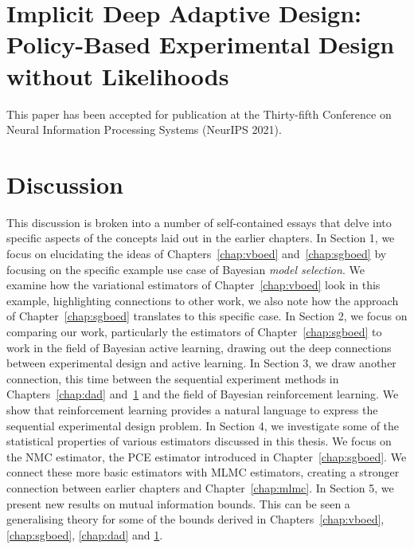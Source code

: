 \documentclass[a4paper, 10pt]{report}
\theoremstyle{plain}
\theoremstyle{definition}
\theoremstyle{remark}
\begin{document}
	\chapter{Implicit Deep Adaptive Design: Policy-Based Experimental Design without Likelihoods}
	\label{chap:idad}
	This paper has been accepted for publication at the Thirty-fifth Conference on Neural Information Processing Systems (NeurIPS 2021).
	
	
	
	\chapter{Discussion}
	\label{chap:discussion}
	This discussion is broken into a number of self-contained essays that delve into specific aspects of the concepts laid out in the earlier chapters.
	In Section 1, we focus on elucidating the ideas of Chapters~\ref{chap:vboed} and~\ref{chap:sgboed} by focusing on the specific example use case of Bayesian \emph{model selection}. We examine how the variational estimators of Chapter~\ref{chap:vboed} look in this example, highlighting connections to other work, we also note how the approach of Chapter~\ref{chap:sgboed} translates to this specific case.
	In Section 2, we focus on comparing our work, particularly the estimators of Chapter~\ref{chap:sgboed} to work in the field of Bayesian active learning, drawing out the deep connections between experimental design and active learning.
	In Section 3, we draw another connection, this time between the sequential experiment methods in Chapters~\ref{chap:dad} and~\ref{chap:idad} and the field of Bayesian reinforcement learning. We show that reinforcement learning provides a natural language to express the sequential experimental design problem.
	In Section 4, we investigate some of the statistical properties of various estimators discussed in this thesis. We focus on the NMC estimator, the PCE estimator introduced in Chapter~\ref{chap:sgboed}. We connect these more basic estimators with MLMC estimators, creating a stronger connection between earlier chapters and Chapter~\ref{chap:mlmc}.
	In Section 5, we present new results on mutual information bounds. This can be seen a generalising theory for some of the bounds derived in Chapters~\ref{chap:vboed}, \ref{chap:sgboed}, \ref{chap:dad} and \ref{chap:idad}.
	
	
	
	
\end{document}
